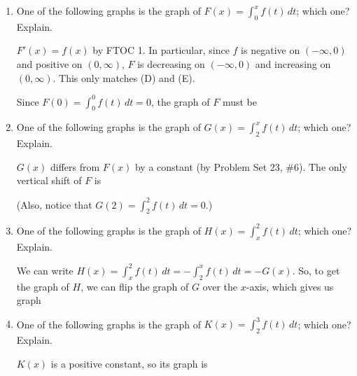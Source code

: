 \documentclass{article}
\begin{document}
\begin{enumerate}[topsep=0pt]
  \begin{enumerate}
  \item
    \begin{problem}[\vfill]
      One of the following graphs is the graph of
      $\displaystyle F(x) = \int_0^x f(t) \,dt$; which one? Explain.
    \end{problem}

    \begin{solution} %
      $F'(x) = f(x)$ by
        FTOC 1.  In particular,
      since $f$ is negative on $(-\infty, 0)$ and positive on $(0,
      \infty)$, $F$ is decreasing on $(-\infty, 0)$ and increasing on $(0,
      \infty)$.  This only matches (D) and (E).

      Since $\displaystyle F(0) = \int_0^0 f(t)\,dt = 0$, the graph of $F$
      must be 
    \end{solution}

  \item
    \begin{problem}[\vfill]
      One of the following graphs is the graph of $\displaystyle G(x) =
      \int_2^x f(t) \,dt$; which one? Explain.
    \end{problem}

    \begin{solution} %
      $G(x)$ differs
        from $F(x)$ by a constant (by
        {{{Problem Set 23}, {{\#6}}}}).  The only vertical shift
      of $F$ is 

      (Also, notice that $G(2) = \displaystyle \int_2^2 f(t)\,dt = 0$.)
    \end{solution}

  \item
    \begin{problem}[\vfill]
      One of the following graphs is the graph of $\displaystyle H(x) =
      \int_x^2 f(t)\,dt$; which one?  Explain.
    \end{problem}

    \begin{solution} %
      We can write $H(x) = \displaystyle \int_x^2 f(t)\,dt = - \int_2^x
      f(t)\,dt = - G(x)$.  So, to get the graph of $H$, we can flip the
      graph of $G$ over the $x$-axis, which gives us graph  
    \end{solution}

  \item
    \begin{problem}[\vfill]
      One of the following graphs is the graph of $\displaystyle K(x) =
      \int_2^3 f(t)\,dt$; which one?  Explain.
    \end{problem}

    \begin{solution} %
      $K(x)$ is a positive constant, so its graph is 
    \end{solution}

  \end{enumerate}
\end{enumerate}
\end{document}
